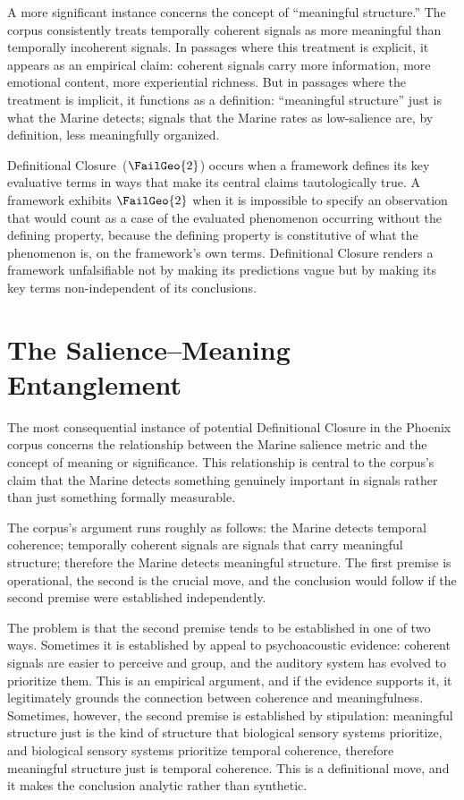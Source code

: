 A more significant instance concerns the concept of ``meaningful
structure.'' The corpus consistently treats temporally coherent
signals as more meaningful than temporally incoherent signals.
In passages where this treatment is explicit, it appears as
an empirical claim: coherent signals carry more information,
more emotional content, more experiential richness. But in
passages where the treatment is implicit, it functions as a
definition: ``meaningful structure'' just is what the Marine
detects; signals that the Marine rates as low-salience are,
by definition, less meaningfully organized.

\begin{auditprop}
\label{ap:definitional-closure}
Definitional Closure~($\FailGeo{2}$) occurs when a framework
defines its key evaluative terms in ways that make its
central claims tautologically true. A framework exhibits
$\FailGeo{2}$ when it is impossible to specify an
observation that would count as a case of the evaluated
phenomenon occurring without the defining property, because
the defining property is constitutive of what the phenomenon
is, on the framework's own terms. Definitional Closure
renders a framework unfalsifiable not by making its
predictions vague but by making its key terms non-independent
of its conclusions.
\end{auditprop}

\section{The Salience--Meaning Entanglement}
\label{sec:salience-meaning}

The most consequential instance of potential Definitional
Closure in the Phoenix corpus concerns the relationship
between the Marine salience metric and the concept of meaning
or significance. This relationship is central to the corpus's
claim that the Marine detects something genuinely important
in signals rather than just something formally measurable.

The corpus's argument runs roughly as follows: the Marine
detects temporal coherence; temporally coherent signals are
signals that carry meaningful structure; therefore the Marine
detects meaningful structure. The first premise is
operational, the second is the crucial move, and the
conclusion would follow if the second premise were established
independently.

The problem is that the second premise tends to be established
in one of two ways. Sometimes it is established by appeal
to psychoacoustic evidence: coherent signals are easier to
perceive and group, and the auditory system has evolved to
prioritize them. This is an empirical argument, and if the
evidence supports it, it legitimately grounds the connection
between coherence and meaningfulness. Sometimes, however,
the second premise is established by stipulation: meaningful
structure just is the kind of structure that biological
sensory systems prioritize, and biological sensory systems
prioritize temporal coherence, therefore meaningful structure
just is temporal coherence. This is a definitional move,
and it makes the conclusion analytic rather than synthetic.

